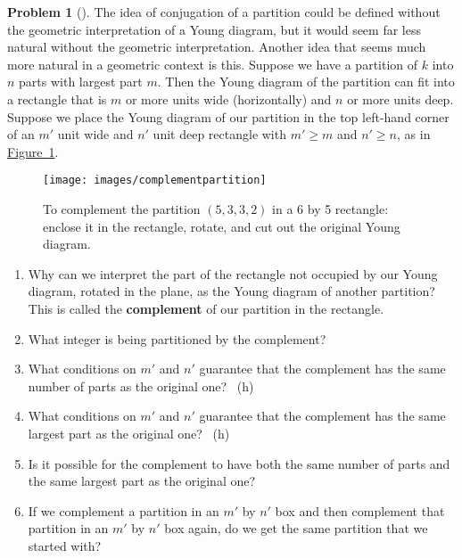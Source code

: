 \documentclass[10pt,]{book}
\newcommand{\terminology}[1]{\textbf{#1}}
\theoremstyle{plain}
\theoremstyle{definition}
\newtheorem{activity}[project]{Problem}
\theoremstyle{definition}
\numberwithin{equation}{chapter}
\begin{document}
\begin{activity}[]\marginsymbol[-1em]{} \label{activity-168}
\hypertarget{p-924}{}%
The idea of conjugation of a partition could be defined without the geometric interpretation of a Young diagram, but it would seem far less natural without the geometric interpretation. Another idea that seems much more natural in a geometric context is this. Suppose we have a partition of \(k\) into \(n\) parts with largest part \(m\). Then the Young diagram of the partition can fit into a rectangle that is \(m\) or more units wide (horizontally) and \(n\) or more units deep. Suppose we place the Young diagram of our partition in the top left-hand corner of an \(m'\) unit wide and \(n'\) unit deep rectangle with \(m'\ge m\) and \(n' \ge n\), as in \hyperref[complementpartition]{Figure~\ref{complementpartition}}.%
\begin{figure}
\centering
\texttt{[image: images/complementpartition]}
\caption{To complement the partition \((5,3,3,2)\) in a 6 by 5 rectangle: enclose it in the rectangle, rotate, and cut out the original Young diagram.\label{complementpartition}}
\end{figure}
\begin{enumerate}[font=\bfseries,label=(\alph*),ref=\alph*]
\item\label{task-117} \marginsymbol[-2.5em]{} \hypertarget{p-925}{}%
Why can we interpret the part of the rectangle not occupied by our Young diagram, rotated in the plane, as the Young diagram of another partition? This is called the \terminology{complement} of our partition in the rectangle.%
\item\label{task-118} \marginsymbol[-2.5em]{} \hypertarget{p-927}{}%
What integer is being partitioned by the complement?%
\item\label{task-119} \marginsymbol[-2.5em]{} \hypertarget{p-929}{}%
What conditions on \(m'\) and \(n'\) guarantee that the complement has the same number of parts as the original one?%
~{\tiny (h)}\item\label{task-120} \marginsymbol[-2.5em]{} \hypertarget{p-932}{}%
What conditions on \(m'\) and \(n'\) guarantee that the complement has the same largest part as the original one?%
~{\tiny (h)}\item\label{task-121} \marginsymbol[-2.5em]{} \hypertarget{p-935}{}%
Is it possible for the complement to have both the same number of parts and the same largest part as the original one?%
\item\label{task-122} \marginsymbol[-2.5em]{} \hypertarget{p-937}{}%
If we complement a partition in an \(m'\) by \(n'\) box and then complement that partition in an \(m'\) by \(n'\) box again, do we get the same partition that we started with?%
\end{enumerate}
\end{activity}
\end{document}
